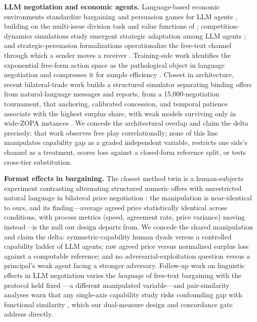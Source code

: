 \documentclass[conference]{IEEEtran}
\begin{document}
\textbf{LLM negotiation and economic agents.} Language-based economic environments standardize bargaining and persuasion games for LLM agents \cite{GLEE2410}, building on the multi-issue division task and value functions of \cite{DealOrNoDeal1706}; competition-dynamics simulations study emergent strategic adaptation among LLM agents \cite{CompeteAI}; and strategic-persuasion formalizations operationalize the free-text channel through which a sender moves a receiver \cite{StrategicPersuasion}. Training-side work identifies the exponential free-form action space as the pathological object in language negotiation and compresses it for sample efficiency \cite{ARIA}. Closest in architecture, recent bilateral-trade work builds a structured simulator separating binding offers from natural-language messages and reports, from a 15{,}000-negotiation tournament, that anchoring, calibrated concession, and temporal patience associate with the highest surplus share, with weak models surviving only in wide-ZOPA instances \cite{BilateralTrade2604}. We concede the architectural overlap and claim the delta precisely: that work observes free play correlationally; none of this line manipulates capability gap as a graded independent variable, restricts one side's channel as a treatment, scores loss against a closed-form reference split, or tests cross-tier substitution.

\textbf{Format effects in bargaining.} The closest method twin is a human-subjects experiment contrasting alternating structured numeric offers with unrestricted natural language in bilateral price negotiation \cite{LanguageOfBargaining2023}: the manipulation is near-identical to ours, and its finding---average agreed price statistically identical across conditions, with process metrics (speed, agreement rate, price variance) moving instead---is the null our design departs from. We concede the shared manipulation and claim the delta: symmetric-capability human dyads versus a controlled capability ladder of LLM agents; raw agreed price versus normalized surplus loss against a computable reference; and no adversarial-exploitation question versus a principal's weak agent facing a stronger adversary. Follow-up work on linguistic effects in LLM negotiation varies the \emph{language} of free-text bargaining with the protocol held fixed \cite{LangBargainIndic2601}---a different manipulated variable---and pair-similarity analyses warn that any single-axis capability study risks confounding gap with functional similarity \cite{GreatModelsThinkAlike}, which our dual-measure design and concordance gate address directly.
\end{document}
